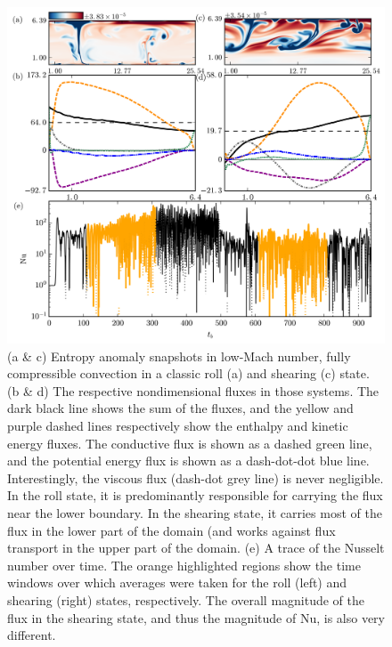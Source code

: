 \begin{figure}[p!]
    \includegraphics[width=\textwidth]{figs/unpublished/shear_fig.pdf}
    \caption[Shearing Convection States]{
	(a \& c) Entropy anomaly snapshots in low-Mach number, fully compressible convection in a classic roll (a) and shearing (c) state.
	(b \& d) The respective nondimensional fluxes in those systems.
	The dark black line shows the sum of the fluxes, and the yellow and purple dashed lines respectively show the enthalpy and kinetic energy fluxes.
	The conductive flux is shown as a dashed green line, and the potential energy flux is shown as a dash-dot-dot blue line.
	Interestingly, the viscous flux (dash-dot grey line) is never negligible.
	In the roll state, it is predominantly responsible for carrying the flux near the lower boundary.
	In the shearing state, it carries most of the flux in the lower part of the domain (and works against flux transport in the upper part of the domain.
	(e) A trace of the Nusselt number over time.
	The orange highlighted regions show the time windows over which averages were taken for the roll (left) and shearing (right) states, respectively.
	The overall magnitude of the flux in the shearing state, and thus the magnitude of Nu, is also very different.
    \label{fig:shear_fig} }
\end{figure}





